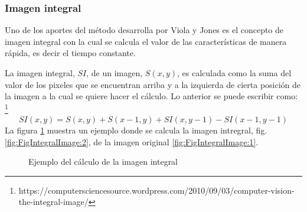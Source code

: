 \subsubsection{Imagen integral}\label{sssec:IntegralImage} 

Uno de los aportes del método desarrolla por Viola y Jones es el concepto de imagen integral con la cual se calcula el valor de las características de manera rápida, es decir el tiempo constante. 

La imagen integral, $SI$, de un imagen, $S(x,y)$, es calculada como la suma del valor de los pixeles que se encuentran arriba y a la izquierda de cierta posición de la imagen a la cual se quiere hacer el cálculo. Lo anterior se puede escribir como: \footnote{https://computersciencesource.wordpress.com/2010/09/03/computer-vision-the-integral-image/}     
$$SI(x,y)=S(x,y) + S(x-1,y) + SI(x,y-1)-SI(x-1,y-1)$$ 
La figura \ref{fig:FigIntegralImage} muestra un  ejemplo donde se calcula la imagen intregral, fig. \ref{fig:FigIntegralImage:2}, de la imagen original \ref{fig:FigIntegralImage:1}.
\begin{figure}[h!]
\centering
{} \qquad
{}
\caption{Ejemplo del cálculo de la imagen integral} \label{fig:FigIntegralImage}
\end{figure}



